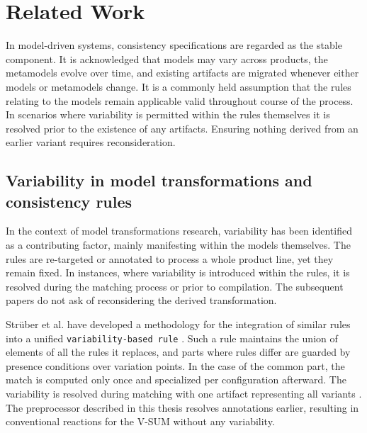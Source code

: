 \chapter{Related Work}
\label{ch:RelatedWork}

In model-driven systems, consistency specifications are regarded as the stable component.
It is acknowledged that models may vary across products, the metamodels evolve over time, and existing artifacts are migrated whenever either models or metamodels change.
It is a commonly held assumption that the rules relating to the models remain applicable valid throughout course of the process.
In scenarios where variability is permitted within the rules themselves it is resolved prior to the existence of any artifacts.
Ensuring nothing derived from an earlier variant requires reconsideration.

\section{Variability in model transformations and consistency rules}
\label{sec:RelatedWork:VariabilityInModelTransformationsAndConsistencyRules}

In the context of model transformations research, variability has been identified as a contributing factor, mainly manifesting within the models themselves.
The rules are re-targeted or annotated to process a whole product line, yet they remain fixed.
In instances, where variability is introduced within the rules, it is resolved during the matching process or prior to compilation.
The subsequent papers do not ask of reconsidering the derived transformation.

Strüber et al. have developed a methodology for the integration of similar rules into a unified \texttt{variability-based rule} \cite{struber2018variability}.
Such a rule maintains the union of elements of all the rules it replaces, and parts where rules differ are guarded by presence conditions over variation points.
In the case of the common part, the match is computed only once and specialized per configuration afterward.
The variability is resolved during matching with one artifact representing all variants \cite{struber2018variability}.
The preprocessor described in this thesis resolves annotations earlier, resulting in conventional reactions for the V-SUM without any variability.

